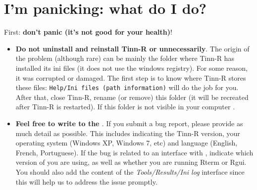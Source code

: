 
\section{I'm panicking: what do I do?}

First: \textbf{don't panic (it's not good for your health)}!

\begin{itemize}
\item \textbf{Do not uninstall and reinstall Tinn-R or \RR{} unnecessarily}.
  The origin of the problem (although rare) can be mainly the folder where Tinn-R has installed its ini files
  (it does not use the windows registry). For some reason, it was corrupted or damaged.
  The first step is to know where Tinn-R stores these files: \texttt{Help/Ini files (path information)}
  will do the job for you. After that, close Tinn-R,
  rename (or remove) this folder (it will be recreated after Tinn-R is restarted).
  If this folder is not visible in your computer \textit{}.
\item \textbf{Feel free to write to the \textit{}}.
  If you submit a bug report, please provide as much detail as possible.
  This includes indicating the Tinn-R version, your operating system (Windows XP, Windows 7, etc) and
  language (English, French, Portuguese). If the bug is related to an interface with \RR{},
  indicate which version of \RR{} you are using, as well as whether you are running Rterm or Rgui.
  You should also add the content of the \textit{Tools/Results/Ini log}
  interface since this will help us to address the issue promptly.
\end{itemize}
